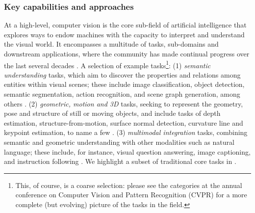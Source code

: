 \subsubsection{Key capabilities and approaches}
\label{sec:vision-capabilities}

At a high-level, computer vision is the core sub-field of artificial intelligence that explores ways to endow machines with the capacity to interpret and understand the visual world. It encompasses a multitude of tasks, sub-domains and downstream applications, where the community has made continual progress over the last several decades \cite{zamir2018taskonomy}. A selection of example tasks\footnote{This, of course, is a coarse selection: please see the categories at the annual conference on Computer Vision and Pattern Recognition (CVPR) for a more complete (but evolving) picture of the tasks in the field.}: (1) \textit{semantic understanding} tasks, which aim to discover the properties and relations among entities within visual scenes; these include image classification, object detection, semantic segmentation, action recognition, and scene graph generation, among others \citep[e.g. ][]{krizhevsky2012imagenet, he2016deep,  krishna2017visual, russakovsky2015imagenet, krizhevsky2009learning, kay2017kinetics, lin2014microsoft}. (2) \textit{geometric, motion and 3D} tasks, seeking to represent the geometry, pose and structure of still or moving objects, and include tasks of depth estimation, structure-from-motion, surface normal detection, curvature line and keypoint estimation, to name a few \citep[e.g. ][]{laina2016deeper, agarwal2011building, wang2015designing, zamir2018taskonomy, ullman1979interpretation}. (3) \textit{multimodal integration} tasks, combining semantic and geometric understanding with other modalities such as natural language; these include, for instance, visual question answering, image captioning, and instruction following \citep[e.g. ][]{antol2015vqa, chen2015microsoft, anderson2018vision, goyal2017making, hudson2019gqa, johnson2017clevr, luo2020univl, akbari2021vatt, huang2021seeing, tsimpoukelli2021multimodal}. We highlight a subset of traditional core tasks in .

